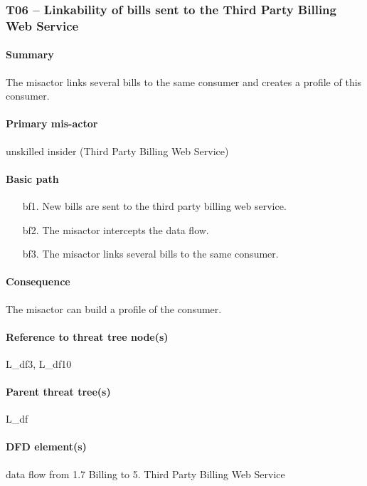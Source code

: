 \subsubsection{T06 -- Linkability of bills sent to the Third Party Billing Web Service}

\paragraph{Summary} The misactor links several bills to the same consumer and
creates a profile of this consumer. 

\paragraph{Primary mis-actor} unskilled insider (Third Party Billing Web
Service)

\paragraph{Basic path}
\begin{enumerate}
	\item[bf1.] New bills are sent to the third party billing web service.
	\item[bf2.] The misactor intercepts the data flow.
	\item[bf3.] The misactor links several bills to the same consumer.
\end{enumerate}

\paragraph{Consequence} The misactor can build a profile of the consumer.

\paragraph{Reference to threat tree node(s)} L\_df3, L\_df10

\paragraph{Parent threat tree(s)} L\_df

\paragraph{DFD element(s)} data flow from 1.7 Billing to 5. Third Party Billing
Web Service

